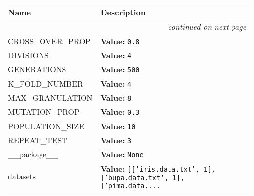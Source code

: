     \vspace{-1cm}
\hspace{\varindent}\begin{longtable}{|p{\varnamewidth}|p{\vardescrwidth}|l}
\cline{1-2}
\cline{1-2} \centering \textbf{Name} & \centering \textbf{Description}& \\
\cline{1-2}
\endhead\cline{1-2}\multicolumn{3}{r}{\small\textit{continued on next page}}\\\endfoot\cline{1-2}
\endlastfoot\raggedright C\-R\-O\-S\-S\-\_\-O\-V\-E\-R\-\_\-P\-R\-O\-P\- & \raggedright \textbf{Value:} 
{\tt 0.8}&\\
\cline{1-2}
\raggedright D\-I\-V\-I\-S\-I\-O\-N\-S\- & \raggedright \textbf{Value:} 
{\tt 4}&\\
\cline{1-2}
\raggedright G\-E\-N\-E\-R\-A\-T\-I\-O\-N\-S\- & \raggedright \textbf{Value:} 
{\tt 500}&\\
\cline{1-2}
\raggedright K\-\_\-F\-O\-L\-D\-\_\-N\-U\-M\-B\-E\-R\- & \raggedright \textbf{Value:} 
{\tt 4}&\\
\cline{1-2}
\raggedright M\-A\-X\-\_\-G\-R\-A\-N\-U\-L\-A\-T\-I\-O\-N\- & \raggedright \textbf{Value:} 
{\tt 8}&\\
\cline{1-2}
\raggedright M\-U\-T\-A\-T\-I\-O\-N\-\_\-P\-R\-O\-P\- & \raggedright \textbf{Value:} 
{\tt 0.3}&\\
\cline{1-2}
\raggedright P\-O\-P\-U\-L\-A\-T\-I\-O\-N\-\_\-S\-I\-Z\-E\- & \raggedright \textbf{Value:} 
{\tt 10}&\\
\cline{1-2}
\raggedright R\-E\-P\-E\-A\-T\-\_\-T\-E\-S\-T\- & \raggedright \textbf{Value:} 
{\tt 3}&\\
\cline{1-2}
\raggedright \_\-\_\-p\-a\-c\-k\-a\-g\-e\-\_\-\_\- & \raggedright \textbf{Value:} 
{\tt None}&\\
\cline{1-2}
\raggedright d\-a\-t\-a\-s\-e\-t\-s\- & \raggedright \textbf{Value:} 
{\tt \texttt{[}\texttt{[}\texttt{'}\texttt{iris.data.txt}\texttt{'}\texttt{, }1\texttt{]}\texttt{, }\texttt{[}\texttt{'}\texttt{bupa.data.txt}\texttt{'}\texttt{, }1\texttt{]}\texttt{, }\texttt{[}\texttt{'}\texttt{pima.data.}\texttt{...}}&\\
\cline{1-2}
\end{longtable}

